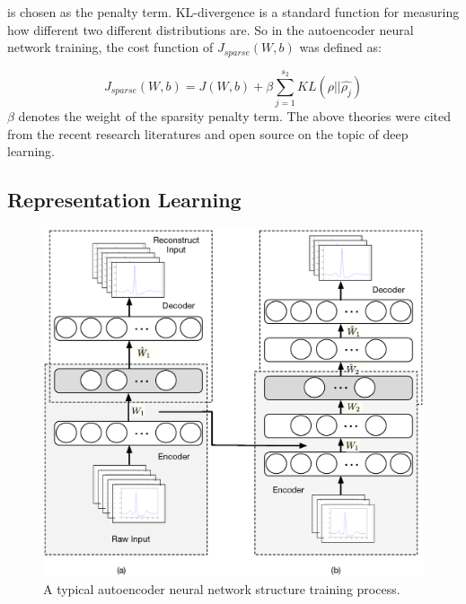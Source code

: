 \documentclass[graybox]{svmult}
\begin{document}
\noindent is chosen as the  penalty term. KL-divergence is a standard function for measuring how different two different distributions are. So in the autoencoder neural network training, the cost function of $J_{sparse}(W,b)$ was defined as:

\begin{equation}
J_{sparse}(W,b) = J(W,b) + \beta \sum_{j=1}^{s_2}KL(\rho||\hat{\rho_j})
\end{equation}
\noindent $\beta$ denotes the weight of the sparsity penalty term.
The above theories were cited from the recent research literatures \citep[e.g.][]{zou2012deep} and open source \citep{ufldl} on the topic of deep learning.


\subsection{Representation Learning}


%
\begin{figure}[]
\sidecaption
\includegraphics[scale=.4]{autoencoder}
%
%
\caption{A typical autoencoder neural network structure training process.}
\label{fig:4}       %
\end{figure}
\end{document}
